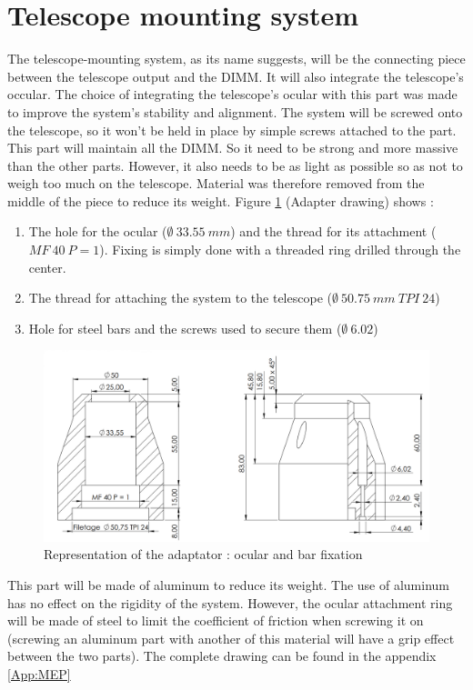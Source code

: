 \section{Telescope mounting system}\label{sec:adaptator}
The telescope-mounting system, as its name suggests, will be the connecting piece between the telescope output and the \Gls{DIMM}. It will 
also integrate the telescope's occular. The choice of integrating the telescope's ocular with this part was made to improve the system's 
stability and alignment. The system will be screwed onto the telescope, so it won't be held in place by simple screws attached to 
the part. \newline
This part will maintain all the \Gls{DIMM}. So it need to be strong and more massive than the other parts. However, it also needs to be as 
light as possible so as not to weigh too much on the telescope. Material was therefore removed from the middle of the piece to reduce 
its weight.
\bigbreak
Figure \ref{fig:Mec_Adapter1} (Adapter drawing) shows :
\begin{enumerate}
    \item The hole for the ocular ($\emptyset\ 33.55\ mm$) and the thread for its attachment ($MF\ 40\ P=1$). Fixing is simply done 
    with a threaded ring drilled through the center.
    \item The thread for attaching the system to the telescope ($\emptyset\ 50.75\ mm\ TPI\ 24$)
    \item Hole for steel bars and the screws used to secure them ($\emptyset\ 6.02$)
\end{enumerate}
\begin{figure}[H]
    \centering
    \includegraphics[scale=0.6]{assets/figures/Mechanical Design/Dessin_Part1_adapter.png}
    \caption{Representation of the adaptator : ocular and bar fixation}
    \label{fig:Mec_Adapter1}
\end{figure}
This part will be made of aluminum to reduce its weight. The use of aluminum has no effect on the rigidity of the system. \newline
However, the ocular attachment ring will be made of steel to limit the coefficient of friction when screwing it on 
(screwing an aluminum part with another of this material will have a grip effect between the two parts).
\bigbreak
The complete drawing can be found in the appendix \ref{App:MEP}
\newpage
